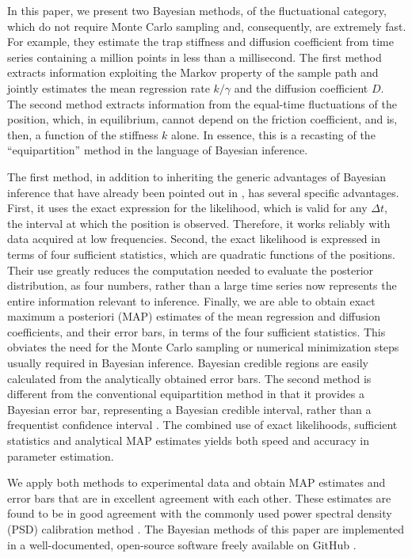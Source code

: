 \documentclass[fleqn,10pt]{wlscirep}
\begin{document}
In this paper, we present two Bayesian methods, of the fluctuational
category, which do not require Monte Carlo sampling and, consequently,
are extremely fast. For example, they estimate the trap stiffness
and diffusion coefficient from time series containing a million points
in less than a millisecond. The first method extracts information
exploiting the Markov property of the sample path and jointly estimates
the mean regression rate $k/\gamma$ and the diffusion coefficient
$D$. The second method extracts information from the equal-time fluctuations
of the position, which, in equilibrium, cannot depend on the friction
coefficient, and is, then, a function of the stiffness $k$ alone.
In essence, this is a recasting of the ``equipartition'' method
in the language of Bayesian inference.

The first method, in addition to inheriting the generic advantages
of Bayesian inference that have already been pointed out in \cite{richly2013calibrating},
has several specific advantages. First, it uses the exact expression
for the likelihood, which is valid for any $\Delta t$, the interval
at which the position is observed. Therefore, it works reliably with
data acquired at low frequencies. Second, the exact likelihood is
expressed in terms of four sufficient statistics, which are quadratic
functions of the positions. Their use greatly reduces the computation
needed to evaluate the posterior distribution, as four numbers, rather
than a large time series now represents the entire information relevant
to inference. Finally, we are able to obtain exact maximum a posteriori
(MAP) estimates of the mean regression and diffusion coefficients,
and their error bars, in terms of the four sufficient statistics.
This obviates the need for the Monte Carlo sampling or numerical minimization
steps usually required in Bayesian inference. Bayesian credible regions
are easily calculated from the analytically obtained error bars. The
second method is different from the conventional equipartition method
in that it provides a Bayesian error bar, representing a Bayesian
credible interval, rather than a frequentist confidence interval \cite{jaynes1976confidence}.
The combined use of exact likelihoods, sufficient statistics and analytical
MAP estimates yields both speed and accuracy in parameter estimation.

We apply both methods to experimental data and obtain MAP estimates
and error bars that are in excellent agreement with each other. These
estimates are found to be in good agreement with the commonly used
power spectral density (PSD) calibration method \cite{berg2004power}.\textcolor{teal}{{}
}The Bayesian methods of this paper are implemented in a well-documented,
open-source software freely available on GitHub \cite{pybisp}.
\end{document}
